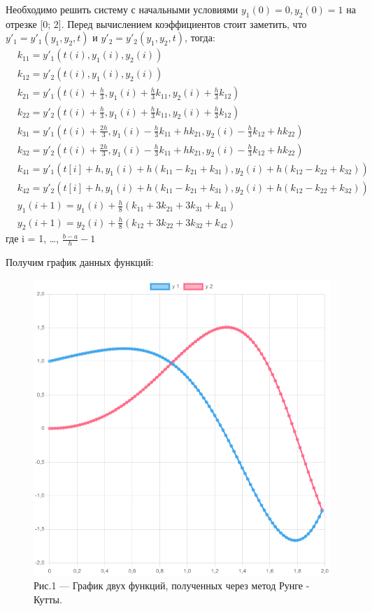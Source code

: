 \documentclass[a4paper,12pt]{article}
\begin{document}
Необходимо решить систему с начальными условиями $y_1(0) = 0, y_2(0) = 1$ на отрезке [0; 2].
Перед вычислением коэффициентов стоит заметить, что $y'_1 = y'_1(y_1, y_2, t)$ и $y'_2 = y'_2(y_1, y_2, t)$,
тогда:
\begin{align}
    &k_{11} = y'_1(t(i), y_1(i), y_2(i)) \nonumber \\
    &k_{12} = y'_2(t(i), y_1(i), y_2(i)) \nonumber \\
    &k_{21} = y'_1(t(i) + \frac{h}{3}, y_1(i) + \frac{h}{3}k_{11}, y_2(i) + \frac{h}{3} k_{12}) \nonumber \\
    &k_{22} = y'_2(t(i) + \frac{h}{3}, y_1(i) + \frac{h}{3}k_{11}, y_2(i) + \frac{h}{3} k_{12}) \nonumber \\
    &k_{31} = y'_1(t(i) + \frac{2h}{3}, y_1(i) - \frac{h}{3}k_{11} + hk_{21}, y_2(i) - \frac{h}{3}k_{12} + hk_{22}) \\
    &k_{32} = y'_2(t(i) + \frac{2h}{3}, y_1(i) - \frac{h}{3}k_{11} + hk_{21}, y_2(i) - \frac{h}{3}k_{12} + hk_{22}) \nonumber \\
    &k_{41} = y'_1(t[i] + h, y_1(i) + h (k_{11} - k_{21} + k_{31}), y_2(i) + h(k_{12} - k_{22} + k_{32})) \nonumber \\
    &k_{42} = y'_2(t[i] + h, y_1(i) + h (k_{11} - k_{21} + k_{31}), y_2(i) + h(k_{12} - k_{22} + k_{32})) \nonumber \\
    &y_1(i + 1) = y_1(i) + \frac{h}{8} (k_{11} + 3k_{21} + 3k_{31} + k_{41}) \nonumber \\
    &y_2(i + 1) = y_2(i) + \frac{h}{8} (k_{12} + 3k_{22} + 3k_{32} + k_{42}) \nonumber 
\end{align}
где i = 1, \dots, $\frac{b-a}{h} - 1$

Получим график данных функций:
\begin{figure}[h]
    \centering
    \includegraphics[width=0.31\linewidth]{pictures/testTaskResult.png}
    \captionsetup{labelformat=empty}
    \caption{Рис.1 --- График двух функций, полученных через метод Рунге - Кутты.}
\end{figure}
\end{document}
